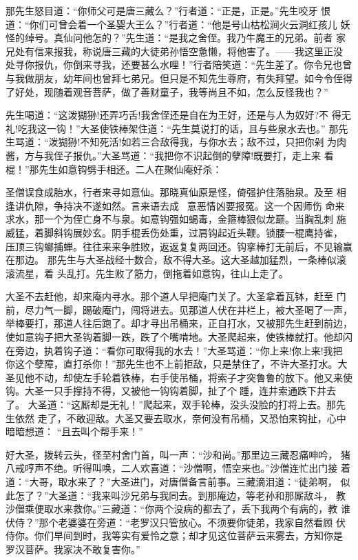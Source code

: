 那先生怒目道：“你师父可是唐三藏么？”行者道：“正是，正是。”先生咬牙
恨道：“你们可曾会着一个圣婴大王么？”行者道：“他是号山枯松涧火云洞红孩儿
妖怪的绰号。真仙问他怎的？”先生道：“是我之舍侄。我乃牛魔王的兄弟。前者
家兄处有信来报我，称说唐三藏的大徒弟孙悟空惫懒，将他害了。——我这里正没
处寻你报仇，你倒来寻我，还要甚么水哩！”行者陪笑道：“先生差了。你令兄也曾
与我做朋友，幼年间也曾拜七弟兄。但只是不知先生尊府，有失拜望。如今令侄得
了好处，现随着观音菩萨，做了善财童子，我等尚且不如，怎么反怪我也？”

先生喝道：“这泼猢狲!还弄巧舌!我舍侄还是自在为王好，还是与人为奴好?不
得无礼!吃我这一钩！”大圣使铁棒架住道：“先生莫说打的话，且与些泉水去也。”
那先生骂道：“泼猢狲!不知死活!如若三合敌得我，与你水去；敌不过，只把你剁
为肉酱，方与我侄子报仇。”大圣骂道：“我把你不识起倒的孽障!既要打，走上来
看棍！”那先生如意钩劈手相还。二人在聚仙庵好杀：

圣僧误食成胎水，行者来寻如意仙。那晓真仙原是怪，倚强护住落胎泉。及至
相逢讲仇隙，争持决不遂如然。言来语去成，意恶情凶要报冤。这一个因师伤
命来求水，那一个为侄亡身不与泉。如意钩强如蝎毒，金箍棒狠似龙巅。当胸乱刺
施威猛，着脚斜钩展妙玄。阴手棍丢伤处重，过肩钩起近头鞭。锁腰一棍鹰持雀，
压顶三钩螂捕蝉。往往来来争胜败，返返复复两回还。钩挛棒打无前后，不见输赢
在那边。
那先生与大圣战经十数合，敌不得大圣。这大圣越加猛烈，一条棒似滚滚流星，着
头乱打。先生败了筋力，倒拖着如意钩，往山上走了。

大圣不去赶他，却来庵内寻水。那个道人早把庵门关了。大圣拿着瓦钵，赶至
门前，尽力气一脚，踢破庵门，闯将进去。见那道人伏在井栏上，被大圣喝了一声，
举棒要打，那道人往后跑了。却才寻出吊桶来，正自打水，又被那先生赶到前边，
使如意钩子把大圣钩着脚一跌，跌了个嘴啃地。大圣爬起来，使铁棒就打。他却闪
在旁边，执着钩子道：“看你可取得我的水去！”大圣骂道：“你上来!你上来!我把
你这个孽障，直打杀你！”那先生也不上前拒敌，只是禁住了，不许大圣打水。大
圣见他不动，却使左手轮着铁棒，右手使吊桶，将索子才突鲁鲁的放下。他又来使
钩。大圣一只手撑持不得，又被他一钩钩着脚，扯了个踵，连井索通跌下井去了。
大圣道：“这厮却是无礼！”爬起来，双手轮棒，没头没脸的打将上去。那先生依然
走了，不敢迎敌。大圣又要去取水，奈何没有吊桶，又恐怕来钩扯，心中暗暗想道：
“且去叫个帮手来！”

好大圣，拨转云头，径至村舍门首，叫一声：“沙和尚。”那里边三藏忍痛呻吟，
猪八戒哼声不绝。听得叫唤，二人欢喜道：“沙僧啊，悟空来也。”沙僧连忙出门接
着道：“大哥，取水来了？”大圣进门，对唐僧备言前事。三藏滴泪道：“徒弟啊，
似此怎了？”大圣道：“我来叫沙兄弟与我同去。到那庵边，等老孙和那厮敌斗，
教沙僧乘便取水来救你。”三藏道：“你两个没病的都去了，丢下我两个有病的，教
谁伏侍？”那个老婆婆在旁道：“老罗汉只管放心。不须要你徒弟，我家自然看顾
伏侍你。你们早间到时，我等实有爱怜之意；却才见这位菩萨云来雾去，方知你是
罗汉菩萨。我家决不敢复害你。”


